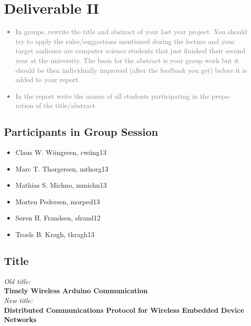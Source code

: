 \chapter{Deliverable II}
\textcolor{gray}{%
\begin{itemize}
        \item In groups, rewrite the title and abstract of your last year project. You should try to apply the rules/suggestions mentioned during the lecture and your target audience are computer science students that just finished their second year at the university. The basis for the abstract is your group work but it should be then individually improved (after the feedback you get) before it is added to your report.
        \item In the report write the names of all students participating in the prepa- ration of the title/abstract.
\end{itemize}}
\section{Participants in Group Session}
\begin{multicols}{2}
    \begin{itemize}
        \item Claus W. Wiingreen, cwiing13
        \item Marc T. Thorgersen, mthorg13
        \item Mathias S. Michno, mmichn13
        \item Morten Pedersen, morped13
        \item Søren H. Frandsen, sfrand12
        \item Troels B. Krøgh, tkragh13
    \end{itemize}
\end{multicols}

\section{Title}
\begin{center}
    \textit{Old title:} \\
    \textbf{Timely Wireless Arduino Communication}\\
    \textit{New title:}\\
    \textbf{Distributed Communications Protocol for Wireless Embedded Device Networks}
\end{center}
